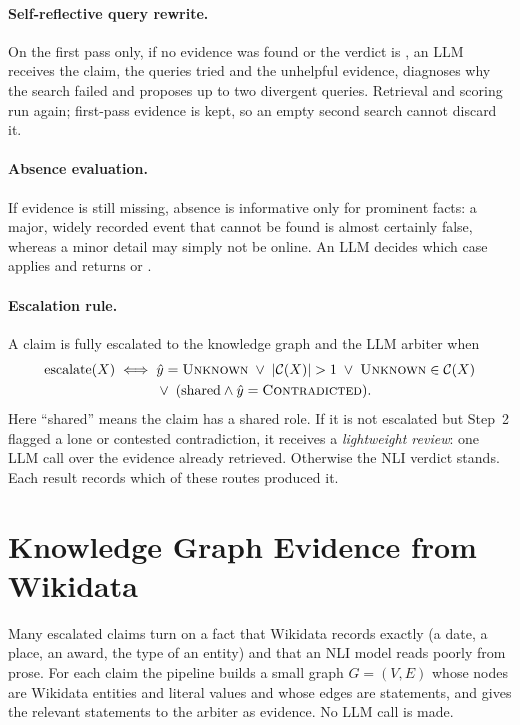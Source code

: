 \paragraph{Self-reflective query rewrite.} On the first pass only, if no evidence was found or the verdict is \Unk, an LLM receives the claim, the queries tried and the unhelpful evidence, diagnoses why the search failed and proposes up to two divergent queries. Retrieval and scoring run again; first-pass evidence is kept, so an empty second search cannot discard it.

\paragraph{Absence evaluation.} If evidence is still missing, absence is informative only for prominent facts: a major, widely recorded event that cannot be found is almost certainly false, whereas a minor detail may simply not be online. An LLM decides which case applies and returns \Con{} or \Unk.

\paragraph{Escalation rule.} A claim is fully escalated to the knowledge graph and the LLM arbiter when
\begin{equation}
\label{eq:escalate}
  \text{escalate}(X) \iff
  \begin{aligned}[t]
    & \hat{y} = \textsc{Unknown} \;\vee\; \lvert \mathcal{C}(X) \rvert > 1 \;\vee\; \textsc{Unknown} \in \mathcal{C}(X) \\
    & \vee\; (\text{shared} \wedge \hat{y} = \textsc{Contradicted}).
  \end{aligned}
\end{equation}
Here ``shared'' means the claim has a shared role. If it is not escalated but Step~2 flagged a lone or contested contradiction, it receives a \emph{lightweight review}: one LLM call over the evidence already retrieved. Otherwise the NLI verdict stands. Each result records which of these routes produced it.

\section{Knowledge Graph Evidence from Wikidata}
\label{sec:kg}

Many escalated claims turn on a fact that Wikidata records exactly (a date, a place, an award, the type of an entity) and that an NLI model reads poorly from prose. For each claim the pipeline builds a small graph $G = (V, E)$ whose nodes are Wikidata entities and literal values and whose edges are statements, and gives the relevant statements to the arbiter as evidence. No LLM call is made.

